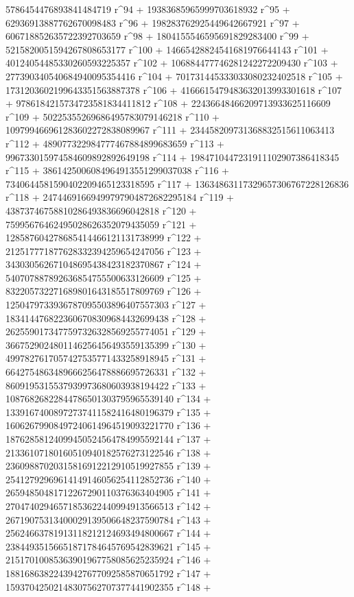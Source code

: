        5786454476893841484719 r^94 + 19383685965999703618932 r^95 + 
       62936913887762670098483 r^96 + 198283762925449642667921 r^97 + 
       606718852635722392703659 r^98 + 
       1804155546595691829283400 r^99 + 
       5215820051594267808653177 r^100 + 
       14665428824541681976644143 r^101 + 
       40124054485330260593225357 r^102 + 
       106884477746281242272209430 r^103 + 
       277390340540684940095354416 r^104 + 
       701731445333033080232402518 r^105 + 
       1731203602199643351563887378 r^106 + 
       4166615479483632013993301618 r^107 + 
       9786184215734723581834411812 r^108 + 
       22436648466209713933625116609 r^109 + 
       50225355269686495783079146218 r^110 + 
       109799466961283602272838089967 r^111 + 
       234458209731368832515611063413 r^112 + 
       489077322984777467884899683659 r^113 + 
       996733015974584609892892649198 r^114 + 
       1984710447231911102907386418345 r^115 + 
       3861425006084964913551299037038 r^116 + 
       7340644581590402209465123318595 r^117 + 
       13634863117329657306767228126836 r^118 + 
       24744691669499797904872682295184 r^119 + 
       43873746758810286493836696042818 r^120 + 
       75995676462495028626352079435059 r^121 + 
       128587604278685414466121131738999 r^122 + 
       212517771877628332394259654247056 r^123 + 
       343030562671048695438423182370867 r^124 + 
       540707887892636854755500633126609 r^125 + 
       832205732271689801643185517809769 r^126 + 
       1250479733936787095503896407557303 r^127 + 
       1834144768223606708309684432699438 r^128 + 
       2625590173477597326328569255774051 r^129 + 
       3667529024801146256456493559135399 r^130 + 
       4997827617057427535771433258918945 r^131 + 
       6642754863489666256478886695726331 r^132 + 
       8609195315537939973680603938194422 r^133 + 
       10876826822844786501303795965539140 r^134 + 
       13391674008972737411582416480196379 r^135 + 
       16062679908497240614964519093221770 r^136 + 
       18762858124099450524564784995592144 r^137 + 
       21336107180160510940182576273122546 r^138 + 
       23609887020315816912212910519927855 r^139 + 
       25412792969614149146056254112852736 r^140 + 
       26594850481712267290110376363404905 r^141 + 
       27047402946571853622440994913566513 r^142 + 
       26719075313400029139506648237590784 r^143 + 
       25624663781913118212124693494800667 r^144 + 
       23844935156651871784645769542839621 r^145 + 
       21517010085363901967758085625235924 r^146 + 
       18816863822439427677092585870651792 r^147 + 
       15937042502148307562707377441902355 r^148 + 
